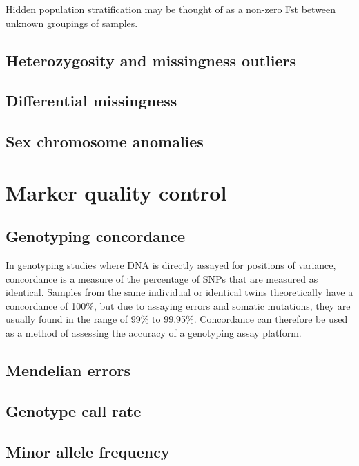 \documentclass[]{book}
\theoremstyle{definition}
\theoremstyle{definition}
\theoremstyle{definition}
\theoremstyle{remark}
\begin{document}
Hidden population stratification may be thought of as a non-zero Fst
between unknown groupings of samples.

\subsection{Heterozygosity and missingness
outliers}\label{heterozygosity-and-missingness-outliers}

\subsection{Differential missingness}\label{differential-missingness}

\subsection{Sex chromosome anomalies}\label{sex-chromosome-anomalies}

\section{Marker quality control}\label{marker-quality-control}

\subsection{Genotyping concordance}\label{genotyping-concordance}

In genotyping studies where DNA is directly assayed for positions of
variance, concordance is a measure of the percentage of SNPs that are
measured as identical. Samples from the same individual or identical
twins theoretically have a concordance of 100\%, but due to assaying
errors and somatic mutations, they are usually found in the range of
99\% to 99.95\%. Concordance can therefore be used as a method of
assessing the accuracy of a genotyping assay platform.

\subsection{Mendelian errors}\label{mendelian-errors}

\subsection{Genotype call rate}\label{genotype-call-rate}

\subsection{Minor allele frequency}\label{minor-allele-frequency}
\end{document}
